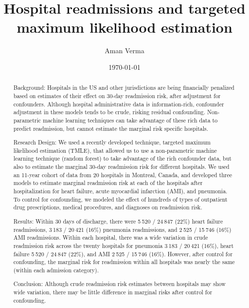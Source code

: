 \documentclass[]{article}\usepackage[]{graphicx}\usepackage[]{color}
\begin{document}
\title{Hospital readmissions and targeted maximum likelihood estimation}
\author{Aman Verma}
\date{\today}

\begin{abstract}






Background: Hospitals in the US and other jurisdictions are being financially penalized based on estimates of their effect on 30-day readmission risk, after adjustment for confounders. Although hospital administrative data is information-rich, confounder adjustment in these models tends to be crude, risking residual confounding. Non-parametric machine learning techniques can take advantage of these rich data to predict readmission, but cannot estimate the marginal risk specific hospitals.

Research Design: We used a recently developed technique, targeted maximum likelihood estimation (TMLE), that allowed us to use a non-parametric machine learning technique (random forest) to take advantage of the rich confounder data, but also to estimate the marginal 30-day readmission risk for different hospitals. We used an 11-year cohort of data from 20 hospitals in Montreal, Canada, and developed three models to estimate marginal readmission risk at each of the hospitals after hospitalization for heart failure, acute myocardial infarction (AMI), and pneumonia. To control for confounding, we modeled the effect of hundreds of types of outpatient drug prescriptions, medical procedures, and diagnoses on readmission risk.

Results: Within 30 days of discharge, there were 5 520 / 24 847 (22\%) heart failure readmissions, 3 183 / 20 421 (16\%) pneumonia readmissions, and 2 525 / 15 746 (16\%) AMI readmissions. Within each hospital, there was a wide variation in crude readmission risk across the twenty hospitals for pneumonia 3 183 / 20 421 (16\%), heart failure 5 520 / 24 847 (22\%), and AMI 2 525 / 15 746 (16\%). However, after control for confounding, the marginal risk for readmission within all hospitals was nearly the same (within each admission category).

Conclusion: Although crude readmission risk estimates between hospitals may show wide variation, there may be little difference in marginal risks after control for confounding.

\end{abstract}
\end{document}

